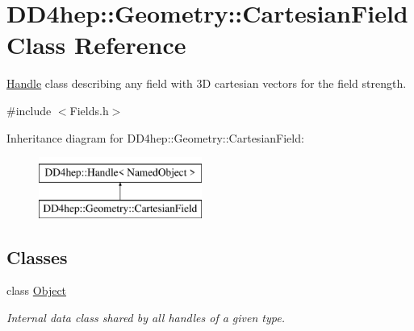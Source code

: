 \hypertarget{class_d_d4hep_1_1_geometry_1_1_cartesian_field}{}\section{D\+D4hep\+:\+:Geometry\+:\+:Cartesian\+Field Class Reference}
\label{class_d_d4hep_1_1_geometry_1_1_cartesian_field}


\hyperlink{class_d_d4hep_1_1_handle}{Handle} class describing any field with 3D cartesian vectors for the field strength.  




{\ttfamily \#include $<$Fields.\+h$>$}

Inheritance diagram for D\+D4hep\+:\+:Geometry\+:\+:Cartesian\+Field\+:\begin{figure}[H]
\begin{center}
\leavevmode
\includegraphics[height=2.000000cm]{class_d_d4hep_1_1_geometry_1_1_cartesian_field}
\end{center}
\end{figure}
\subsection*{Classes}
\begin{DoxyCompactItemize}
\item 
class \hyperlink{class_d_d4hep_1_1_geometry_1_1_cartesian_field_1_1_object}{Object}
\begin{DoxyCompactList}\small\item\em Internal data class shared by all handles of a given type. \end{DoxyCompactList}\end{DoxyCompactItemize}
